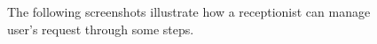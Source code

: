 \begin{figure}[H]
  \label{Receptionist2}
  \centering
    \caption{The following screenshots illustrate how a receptionist can manage user's request through some steps.}
\end{figure}

